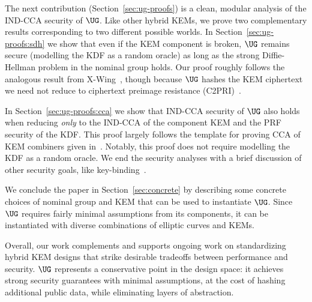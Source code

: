 The next contribution (Section~\ref{sec:ug-proofs}) is a clean, modular  analysis of the IND-CCA security of $\UG$. Like other hybrid KEMs, we prove two complementary results corresponding to two different possible worlds. In Section~\ref{sec:ug-proofs:sdh} we show that even if the KEM component is broken, $\UG$ remains secure (modelling the KDF as a random oracle) as long as the strong Diffie-Hellman problem in the nominal group holds. Our proof roughly follows the analogous result from X-Wing~\cite{rfcdraft}, though because $\UG$ hashes the KEM ciphertext we need not reduce to ciphertext preimage resistance (C2PRI)~\cite{CiC:BCDKSV24}.

In Section~\ref{sec:ug-proofs:cca} we show that IND-CCA security of $\UG$ also holds when reducing \emph{only} to the IND-CCA of the component KEM and the PRF security of the KDF. This proof largely follows the template for proving CCA of KEM combiners given in~\cite{PKC:GiaHeuPoe18}. Notably, this proof does not require modelling the KDF as a random oracle.
We end the security analyses with a brief discussion of other security goals, like key-binding~\cite{CCS:CreDaxMed24}.


We conclude the paper in Section~\ref{sec:concrete} by describing some concrete choices of nominal group and KEM that can be used to instantiate $\UG$. Since $\UG$ requires fairly minimal assumptions from its components, it can be instantiated with diverse combinations of elliptic curves and KEMs.






Overall, our work complements and supports ongoing work on standardizing hybrid KEM designs that strike desirable tradeoffs between performance and security.  $\UG$ represents a conservative point in
the design space: it achieves strong security guarantees with minimal
assumptions, at the cost of hashing additional public data, while eliminating layers of abstraction.

